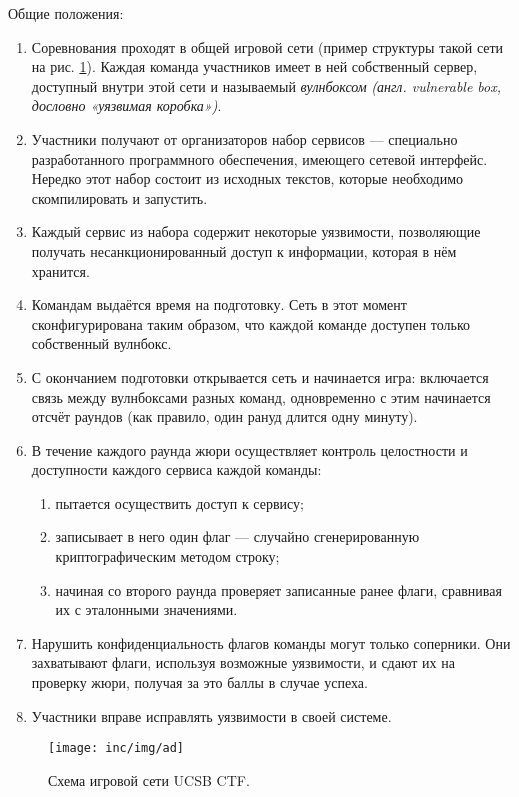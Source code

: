Общие положения:
\begin{enumerate}
  \item Соревнования проходят в общей игровой сети (пример структуры такой сети на рис. \ref{fig:ad}). Каждая команда участников имеет в ней собственный сервер, доступный внутри этой сети и называемый \textit{вулнбоксом} \textit{(англ. vulnerable box, дословно «уязвимая коробка»)}.
  \item Участники получают от организаторов набор сервисов — специально разработанного программного обеспечения, имеющего сетевой интерфейс. Нередко этот набор состоит из исходных текстов, которые необходимо скомпилировать и запустить.
  \item Каждый сервис из набора содержит некоторые уязвимости, позволяющие получать несанкционированный доступ к информации, которая в нём хранится.
  \item Командам выдаётся время на подготовку. Сеть в этот момент сконфигурирована таким образом, что каждой команде доступен только собственный вулнбокс.
  \item С окончанием подготовки открывается сеть и начинается игра: включается связь между вулнбоксами разных команд, одновременно с этим начинается отсчёт раундов (как правило, один рануд длится одну минуту).
  \item В течение каждого раунда жюри осуществляет контроль целостности и доступности каждого сервиса каждой команды:
    \begin{enumerate}
    \item пытается осуществить доступ к сервису;
    \item записывает в него один флаг — случайно сгенерированную криптографическим методом строку;
    \item начиная со второго раунда проверяет записанные ранее флаги, сравнивая их с эталонными значениями.
    \end{enumerate}
  \item Нарушить конфиденциальность флагов команды могут только соперники. Они захватывают флаги, используя возможные уязвимости, и сдают их на проверку жюри, получая за это баллы в случае успеха.
  \item Участники вправе исправлять уязвимости в своей системе.
\end{enumerate}

\begin{figure}[h]
  \centering
  \texttt{[image: inc/img/ad]}
  \caption{Схема игровой сети UCSB CTF.}
  \label{fig:ad}
\end{figure}


